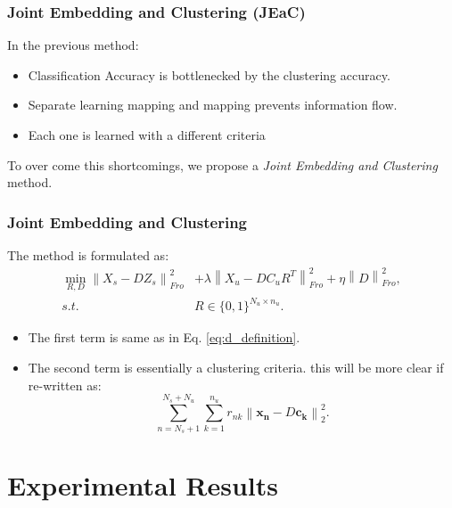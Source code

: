 \documentclass{beamer}
\newcommand{\normtwo}[1]{\left \lVert #1 \right \rVert_2^2}
\newcommand{\normf}[1]{\left \lVert #1 \right \rVert_{Fro}}
\begin{document}
\begin{frame}\frametitle{Joint Embedding and Clustering (JEaC)}
In the previous method:
\begin{itemize}
  \item Classification Accuracy is bottlenecked by the clustering accuracy.
  \item Separate learning mapping and mapping prevents information flow.
  \item Each one is learned with a different criteria
\end{itemize}
To over come this shortcomings, we propose a \textit{Joint Embedding and Clustering} method.
\end{frame}
\begin{frame}\frametitle{Joint Embedding and Clustering}
The method is formulated as:
\begin{align}
\label{eq:joint}
 \min_{R,D} \normf{X_s - D Z_s}^2  &+ \lambda \normf{X_u - D C_u R^T }^2 + \eta \normf{D}^2, \\
   s.t. \quad & R \in \{0,1\}^{N_u \times n_u}. \nonumber
\end{align}
\begin{itemize}
  \item
  The first term is same as in Eq. \eqref{eq:d_definition}.
  \item
  The second term is essentially a clustering criteria. this will be more clear if re-written as:
  \[
  \label{eq:essentialy_clustering}
\sum_{n=N_s+1}^{N_s + N_u} \sum_{k=1}^{n_u} r_{nk} \normtwo{\mathbf{x_n} - D \mathbf{c_k}}.
  \]
\end{itemize}
\end{frame}

\section{Experimental Results}
\label{sec:Experimental Results}
\end{document}
